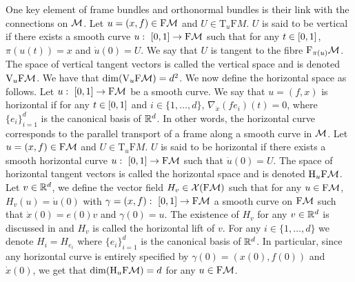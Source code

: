 One key element of frame bundles and orthonormal bundles is their link with the
connections on $\mathcal M$. Let $u = (x, f) \in \mathrm{F}\mathcal{M}$ and
$U \in \mathrm{T}_u \mathrm{F}M$. $U$ is said to be vertical if there exists a
smooth curve $u: \ \left[0,1\right] \to \mathrm{F}\mathcal{M}$ such that for any $t \in \left[0,1\right]$,
$\pi(u(t)) = x$ and $\dot u(0) = U$. We say that $U$ is tangent to the fibre
$\mathrm{F}_{\pi(u)}\mathcal M$. The space of vertical tangent vectors is called the
vertical space and is denoted $\mathrm{V}_u \mathrm{F}\mathcal{M}$. We have that
$\mathrm{dim}(\mathrm{V}_u \mathrm{F}\mathcal M) = d^2$. We now define the horizontal
space as follows. Let $u: \ \left[0,1\right] \to \mathrm{F}\mathcal{M}$ be a smooth curve. We say that
$u = (f,x)$ is horizontal if for any $t \in \left[0,1\right]$ and
$i \in \{1, \dots, d\}$, $\nabla_{\dot x} (f e_i)(t) = 0$, where
$\{e_i\}_{i=1}^d$ is the canonical basis of $\mathbb{R}^d$. In other words, the
horizontal curve corresponds to the parallel transport of a frame along a smooth
curve in $\mathcal M$. Let $u = (x, f) \in \mathrm{F}\mathcal{M}$ and $U \in \mathrm{T}_u
\mathrm{F}M$. $U$ is said to be horizontal if there exists a smooth horizontal
curve $u: \ \left[0,1\right] \to \mathrm{F}\mathcal{M}$ such that $\dot u(0) = U$. The space of
horizontal tangent vectors is called the horizontal space and is denoted
$\mathrm{H}_u \mathrm{F}\mathcal{M}$. Let $v \in \mathbb{R}^d$, we define the vector field
$H_v \in \mathcal{X}(\mathrm{F}\mathcal{M})$ such that for any $u \in \mathrm{F}\mathcal{M}$, $H_v(u) = \dot u(0)$
with $\gamma=(x,f): \ \left[0,1\right] \to \mathrm{F}\mathcal{M}$ a smooth curve on $\mathrm{F}\mathcal{M}$ such that
$\dot x(0) = e(0)v$ and $\gamma(0) = u$. The existence of $H_v$ for any
$v \in \mathbb{R}^d$ is discussed in \citet[p.69-70]{kobayashi1963foundations} and
$H_v$ is called the horizontal lift of $v$. For any $i \in \{1, \dots, d\}$ we
denote $H_i = H_{e_i}$ where $\{e_i\}_{i=1}^d$ is the canonical basis of
$\mathbb{R}^d$. In particular, since any horizontal curve is entirely specified by
$\gamma(0) = (x(0), f(0))$ and $\dot{x}(0)$, we get that
$\mathrm{dim}(\mathrm{H}_u \mathrm{F}\mathcal{M}) = d$ for any $u \in \mathrm{F}\mathcal{M}$.

